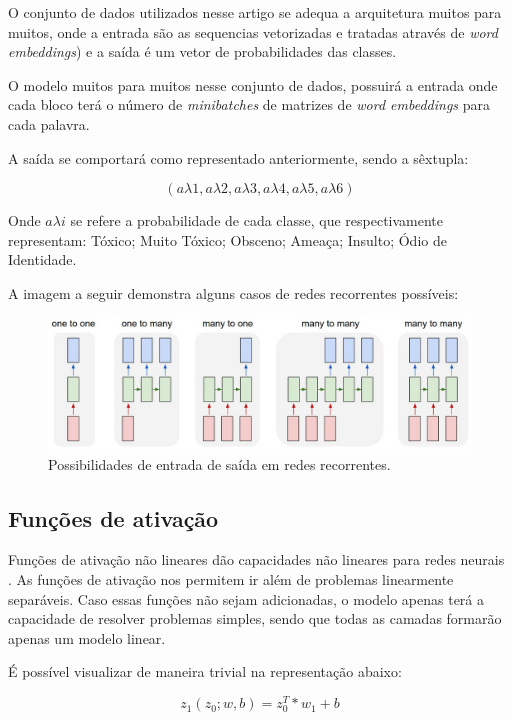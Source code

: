 \documentclass[12pt]{article}
\begin{document}
O conjunto de dados utilizados nesse artigo se adequa a arquitetura muitos para muitos, onde a entrada são as sequencias vetorizadas e tratadas através de \textit{word embeddings}) e a saída é um vetor de probabilidades das classes.

O modelo muitos para muitos nesse conjunto de dados, possuirá a entrada onde cada bloco terá o número de \textit{minibatches} de matrizes de \textit{word embeddings} para cada palavra.

A saída se comportará como representado anteriormente, sendo a sêxtupla:

\[
(a\lambda1, a\lambda2, a\lambda3, a\lambda4, a\lambda5, a\lambda6)
\]

Onde $a \lambda i$ se refere a probabilidade de cada classe, que respectivamente representam: Tóxico; Muito Tóxico; Obsceno; Ameaça; Insulto; Ódio de Identidade.

A imagem a seguir demonstra alguns casos de redes recorrentes possíveis:

\begin{figure}[!htb]
\centering
\includegraphics[width=1\textwidth]{images/rnn-effectiveness-examples.jpeg}
\caption{
    Possibilidades de entrada de saída em redes recorrentes. \cite{karpathy:2015}
}
\label{fig:sigmoid}
\end{figure}

\subsection{Funções de ativação}

Funções de ativação não lineares dão capacidades não lineares para redes neurais \cite{lecun:98}. As funções de ativação nos permitem ir além de problemas linearmente separáveis. Caso essas funções não sejam adicionadas, o modelo apenas terá a capacidade de resolver problemas simples, sendo que todas as camadas formarão apenas um modelo linear.

É possível visualizar de maneira trivial na representação abaixo:

\begin{equation}
    z_1(z_0; w, b) = z_0^T * w_1 + b
\end{equation}
\end{document}
